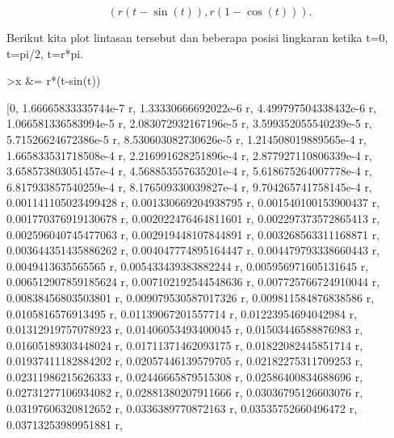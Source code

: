 \documentclass[a4paper,10pt]{article}
\begin{document}
\begin{eulernotebook}
\begin{eulercomment}
\begin{eulercomment}
\begin{eulercomment}
\begin{eulercomment}
\begin{eulercomment}
\begin{eulercomment}
\begin{eulercomment}
\begin{eulercomment}
\begin{eulercomment}
\begin{eulercomment}
\begin{eulercomment}
\begin{eulercomment}
\begin{eulercomment}
\begin{eulercomment}
\begin{eulercomment}
\begin{eulercomment}
\begin{eulercomment}
\begin{eulercomment}
\begin{eulercomment}
\begin{eulercomment}
\begin{eulercomment}
\begin{eulercomment}
\begin{eulercomment}
\begin{eulercomment}
\begin{eulercomment}
\begin{eulercomment}
\begin{eulercomment}
\begin{eulercomment}
\begin{eulercomment}
\end{eulercomment}
\begin{eulerformula}
\[
(r(t-\sin(t)),r(1-\cos(t))).
\]
\end{eulerformula}
\begin{eulercomment}
Berikut kita plot lintasan tersebut dan beberapa posisi lingkaran
ketika t=0, t=pi/2, t=r*pi.
\end{eulercomment}
\begin{eulerprompt}
>x &= r*(t-sin(t))
\end{eulerprompt}
\begin{euleroutput}
  
          [0, 1.66665833335744e-7 r, 1.33330666692022e-6 r, 
  4.499797504338432e-6 r, 1.066581336583994e-5 r, 
  2.083072932167196e-5 r, 3.599352055540239e-5 r, 
  5.71526624672386e-5 r, 8.530603082730626e-5 r, 
  1.214508019889565e-4 r, 1.665833531718508e-4 r, 
  2.216991628251896e-4 r, 2.877927110806339e-4 r, 
  3.658573803051457e-4 r, 4.568853557635201e-4 r, 
  5.618675264007778e-4 r, 6.817933857540259e-4 r, 
  8.176509330039827e-4 r, 9.704265741758145e-4 r, 
  0.001141105023499428 r, 0.001330669204938795 r, 
  0.001540100153900437 r, 0.001770376919130678 r, 
  0.002022476464811601 r, 0.002297373572865413 r, 
  0.002596040745477063 r, 0.002919448107844891 r, 
  0.003268563311168871 r, 0.003644351435886262 r, 
  0.004047774895164447 r, 0.004479793338660443 r, 0.0049413635565565 r, 
  0.005433439383882244 r, 0.005956971605131645 r, 
  0.006512907859185624 r, 0.007102192544548636 r, 
  0.007725766724910044 r, 0.00838456803503801 r, 
  0.009079530587017326 r, 0.009811584876838586 r, 0.0105816576913495 r, 
  0.01139067201557714 r, 0.01223954694042984 r, 0.01312919757078923 r, 
  0.01406053493400045 r, 0.01503446588876983 r, 0.01605189303448024 r, 
  0.01711371462093175 r, 0.01822082445851714 r, 0.01937411182884202 r, 
  0.02057446139579705 r, 0.02182275311709253 r, 0.02311986215626333 r, 
  0.02446665879515308 r, 0.02586400834688696 r, 0.02731277106934082 r, 
  0.02881380207911666 r, 0.03036795126603076 r, 0.03197606320812652 r, 
  0.0336389770872163 r, 0.03535752660496472 r, 0.03713253989951881 r, 

\end{euleroutput}
\end{eulercomment}
\end{eulercomment}
\end{eulercomment}
\end{eulercomment}
\end{eulercomment}
\end{eulercomment}
\end{eulercomment}
\end{eulercomment}
\end{eulercomment}
\end{eulercomment}
\end{eulercomment}
\end{eulercomment}
\end{eulercomment}
\end{eulercomment}
\end{eulercomment}
\end{eulercomment}
\end{eulercomment}
\end{eulercomment}
\end{eulercomment}
\end{eulercomment}
\end{eulercomment}
\end{eulercomment}
\end{eulercomment}
\end{eulercomment}
\end{eulercomment}
\end{eulercomment}
\end{eulercomment}
\end{eulercomment}
\end{eulernotebook}
\end{document}
